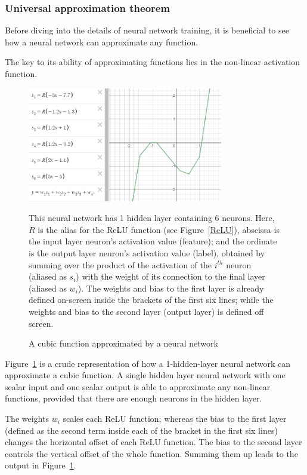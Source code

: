 \documentclass[a4paper, 12pt]{article}
\begin{document}
\subsubsection{Universal approximation theorem}
    Before diving into the details of neural network training, it is beneficial to see how a neural network can approximate any function.

    The key to its ability of approximating functions lies in the non-linear activation function. 

    \begin{figure}[H]
        
    \begin{center}
        \includegraphics[height=5cm]{PPT/UniversalApproximationTheorem.png}
        \caption{A cubic function approximated by a neural network}\label{UniversalApproximationTheorem}
    \end{center}
    This neural network has 1 hidden layer containing 6 neurons.
    Here, $R$ is the alias for the ReLU function (see Figure~\ref{ReLU}), abscissa is the input layer neuron's activation value (feature); and the ordinate is the output layer neuron's activation value (label), obtained by summing over the product of the activation of the $i^{th}$ neuron (aliased as $s_i$) with the weight of its connection to the final layer (aliased as $w_i$).
    The weights and bias to the first layer is already defined on-screen inside the brackets of the first six lines; while the weights and bias to the second layer (output layer) is defined off screen.
    \end{figure}
    
    Figure~\ref{UniversalApproximationTheorem} is a crude representation of how a 1-hidden-layer neural network can approximate a cubic function. A single hidden layer neural network with one scalar input and one scalar output is able to approximate any non-linear functions, provided that there are enough neurons in the hidden layer.

    The weights $w_i$ scales each ReLU function; whereas the bias to the first layer (defined as the second term inside each of the bracket in the first six lines) changes the horizontal offset of each ReLU function. The bias to the second layer controls the vertical offset of the whole function. Summing them up leads to the output in Figure~\ref{UniversalApproximationTheorem}.
\end{document}

